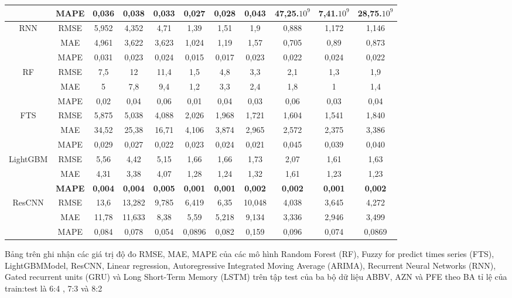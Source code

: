 \documentclass[conference]{IEEEtran}
\begin{document}
\begin{table}[H]
\begin{adjustbox}{width=0.5\textwidth}
\begin{tabular}{|c|c|c|c|c|c|c|c|c|c|c|}
         & MAPE & 0,036 & 0,038 & 0,033 & 0,027 & 0,028 & 0,043 & 47,25.$10^9$ & 7,41.$10^9$ & 28,75.$10^9$ \\ \cline{2-11} \hline
         \multirow{3}{*}{RNN} & RMSE & 5,952 & 4,352 & 4,71 & 1,39 & 1,51 & 1,9 & 0,888 & 1,172 & 1,146 \\ \cline{2-11}
         & MAE & 4,961 & 3,622 & 3,623 & 1,024 & 1,19 & 1,57 & 0,705 & 0,89 & 0,873 \\ \cline{2-11}
         & MAPE & 0,031 & 0,023 & 0,024 & 0,015 & 0,017 & 0,023 & 0,022 & 0,024 & 0,022 \\ \cline{2-11} \hline
         \multirow{3}{*}{RF} & RMSE & 7,5  & 12 & 11,4 & 1,5 & 4,8 & 3,3 & 2,1 & 1,3 & 1,9 \\ \cline{2-11}
         & MAE & 5 & 7,8 & 9,4 & 1,2 & 3,3 & 2,4 & 1,8 & 1 & 1,4 \\ \cline{2-11}
         & MAPE & 0,02 & 0,04 & 0,06 & 0,01 & 0,04 & 0,03 & 0,06 & 0,03 & 0,04 \\ \cline{2-11} \hline
         \multirow{3}{*}{FTS} & RMSE & 5,875  & 5,038 & 4,088 & 2,026 & 1,968 & 1,721 & 1,604 & 1,541 & 1,840 \\ \cline{2-11}
         & MAE & 34,52 & 25,38 & 16,71 & 4,106 & 3,874 & 2,965 & 2,572 & 2,375 & 3,386 \\ \cline{2-11}
         & MAPE & 0,029 & 0,027 & 0,022 & 0,023 & 0,024 & 0,021 & 0,045 & 0,039 & 0,040 \\ \cline{2-11} \hline
         \multirow{3}{*}{LightGBM} & RMSE & 5,56  & 4,42 & 5,15 & 1,66 & 1,66 & 1,73 & 2,07 & 1,61 & 1,63 \\ \cline{2-11}
         & MAE & 4,31 & 3,38 & 4,07 & 1,28 & 1,24 & 1,32 & 1,61 & 1,23 & 1,23 \\ \cline{2-11}
         & \textbf{MAPE} & \textbf{0,004} & \textbf{0,004} & \textbf{0,005} & \textbf{0,001} & \textbf{0,001} & \textbf{0,002} & \textbf{0,002} & \textbf{0,001} & \textbf{0,002} \\ \cline{2-11} \hline
         \multirow{3}{*}{ResCNN} & RMSE & 13,6  & 13,282 & 9,785 & 6,419 & 6,35 & 10,048 & 4,038 & 3,645 & 4,272 \\ \cline{2-11}
         & MAE & 11,78 & 11,633 & 8,38 & 5,59 & 5,218 & 9,134 & 3,336 & 2,946 & 3,499 \\ \cline{2-11}
         & MAPE & 0,084 & 0,078 & 0,054 & 0,0896 & 0,082 & 0,159 & 0,096 & 0,074 & 0,0869 \\ \cline{2-11} \hline
    \end{tabular}
    \end{adjustbox}
\end{table}
Bảng trên ghi nhận các giá trị độ đo RMSE, MAE, MAPE của các mô hình Random Forest (RF), Fuzzy for predict times series (FTS), 
LightGBMModel, ResCNN, Linear regression, Autoregressive Integrated Moving Average (ARIMA), Recurrent Neural Networks (RNN), Gated recurrent units (GRU)
và Long Short-Term Memory (LSTM) trên tập test của ba bộ dữ liệu ABBV, AZN và PFE
theo BA tỉ lệ của train:test là 6:4 , 7:3 và 8:2
\end{document}
